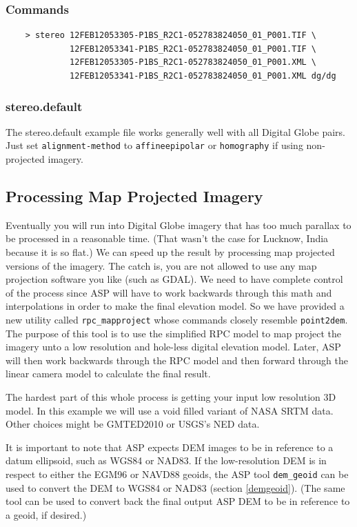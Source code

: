 \subsubsection*{Commands}

\begin{verbatim}
    > stereo 12FEB12053305-P1BS_R2C1-052783824050_01_P001.TIF \
             12FEB12053341-P1BS_R2C1-052783824050_01_P001.TIF \
             12FEB12053305-P1BS_R2C1-052783824050_01_P001.XML \
             12FEB12053341-P1BS_R2C1-052783824050_01_P001.XML dg/dg
\end{verbatim}

\subsubsection*{stereo.default}

The stereo.default example file works generally well with all Digital
Globe pairs. Just set \texttt{alignment-method} to
\texttt{affineepipolar} or \texttt{homography} if using non-projected
imagery.

\subsection{Processing Map Projected Imagery}
\label{mapproj}

Eventually you will run into Digital Globe imagery that has too much
parallax to be processed in a reasonable time. (That wasn't the case
for Lucknow, India because it is so flat.) We can speed up the result
by processing map projected versions of the imagery. The catch is, you
are not allowed to use any map projection software you like (such as
GDAL). We need to have complete control of the process since ASP will
have to work backwards through this math and interpolations in order
to make the final elevation model. So we have provided a new utility
called \texttt{rpc\_mapproject} whose commands closely resemble
\texttt{point2dem}. The purpose of this tool is to use the simplified
RPC model to map project the imagery unto a low resolution and
hole-less digital elevation model. Later, ASP will then work backwards
through the RPC model and then forward through the linear camera model
to calculate the final result.

The hardest part of this whole process is getting your input low
resolution 3D model. In this example we will use a void filled variant
of NASA SRTM data. Other choices might be GMTED2010 or USGS's NED
data.

It is important to note that ASP expects DEM images to be in
reference to a datum ellipsoid, such as WGS84 or NAD83. If the
low-resolution DEM is in respect to either the EGM96 or NAVD88 geoids,
the ASP tool \texttt{dem\_geoid} can be used to convert the DEM to WGS84
or NAD83 (section \ref{demgeoid}). (The same tool can be used to convert
back the final output ASP DEM to be in reference to a geoid, if
desired.)

